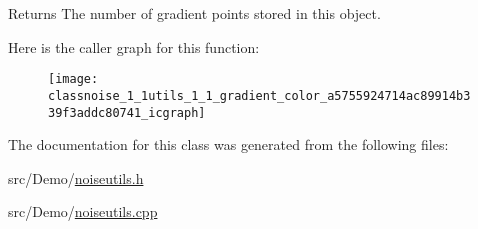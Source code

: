\begin{DoxyReturn}{Returns}
The number of gradient points stored in this object. 
\end{DoxyReturn}


Here is the caller graph for this function\+:\nopagebreak
\begin{figure}[H]
\begin{center}
\leavevmode
\texttt{[image: classnoise\_1\_1utils\_1\_1\_gradient\_color\_a5755924714ac89914b339f3addc80741\_icgraph]}
\end{center}
\end{figure}




The documentation for this class was generated from the following files\+:\begin{DoxyCompactItemize}
\item 
src/\+Demo/\hyperlink{_demo_2noiseutils_8h}{noiseutils.\+h}\item 
src/\+Demo/\hyperlink{_demo_2noiseutils_8cpp}{noiseutils.\+cpp}\end{DoxyCompactItemize}
